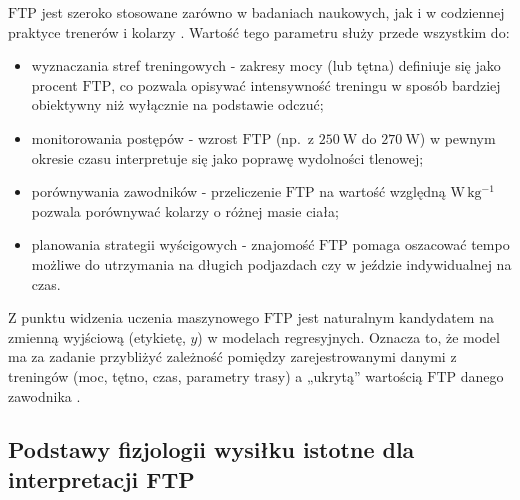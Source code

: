 $\mathrm{FTP}$ jest szeroko stosowane zarówno w badaniach naukowych, jak i w codziennej praktyce trenerów i kolarzy \cite{borszcz2018ftp,allen2019power,karsten2021cpftp,denham2020predictftp}.
Wartość tego parametru służy przede wszystkim do:
\begin{itemize}
  \item wyznaczania stref treningowych - zakresy mocy (lub tętna) definiuje się jako procent $\mathrm{FTP}$, co pozwala opisywać intensywność treningu w sposób bardziej obiektywny niż wyłącznie na podstawie odczuć;
  \item monitorowania postępów - wzrost $\mathrm{FTP}$ (np.\ z $250\ \mathrm{W}$ do $270\ \mathrm{W}$) w pewnym okresie czasu interpretuje się jako poprawę wydolności tlenowej;
  \item porównywania zawodników - przeliczenie $\mathrm{FTP}$ na wartość względną $\mathrm{W\,kg^{-1}}$ pozwala porównywać kolarzy o różnej masie ciała;
  \item planowania strategii wyścigowych - znajomość $\mathrm{FTP}$ pomaga oszacować tempo możliwe do utrzymania na długich podjazdach czy w jeździe indywidualnej na czas.
\end{itemize}

Z punktu widzenia uczenia maszynowego $\mathrm{FTP}$ jest naturalnym kandydatem na zmienną wyjściową (etykietę, $y$) w modelach regresyjnych.
Oznacza to, że model ma za zadanie przybliżyć zależność pomiędzy zarejestrowanymi danymi z treningów (moc, tętno, czas, parametry trasy) a „ukrytą” wartością $\mathrm{FTP}$ danego zawodnika \cite{stockwell2023mlftp,denham2020predictftp}.

\subsection{Podstawy fizjologii wysiłku istotne dla interpretacji FTP}

